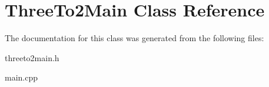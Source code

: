 \hypertarget{class_three_to2_main}{}\section{Three\+To2\+Main Class Reference}
\label{class_three_to2_main}


The documentation for this class was generated from the following files\+:\begin{DoxyCompactItemize}
\item 
threeto2main.\+h\item 
main.\+cpp\end{DoxyCompactItemize}
